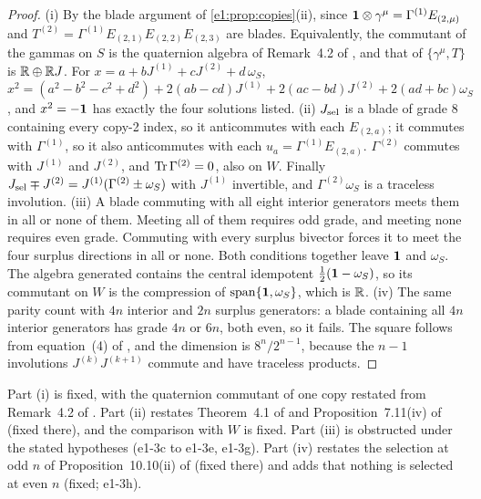 \begin{proof}
(i) By the blade argument of \cref{e1:prop:copies}(ii), since $\mathbf 1\otimes\gamma^\mu=\Gamma^{(1)}E_{(2,\mu)}$ and
$T^{(2)}=\Gamma^{(1)}E_{(2,1)}E_{(2,2)}E_{(2,3)}$ are blades. Equivalently, the commutant of the gammas on $S$ is the quaternion algebra of Remark~4.2
of \cite{ES17}, and that of $\{\gamma^\mu,T\}$ is $\mathbb{R}\oplus\mathbb{R} J$. For $x=a+bJ^{(1)}+cJ^{(2)}+d\,\omega_S$,
$x^2=(a^2-b^2-c^2+d^2)+2(ab-cd)J^{(1)}+2(ac-bd)J^{(2)}+2(ad+bc)\omega_S$, and $x^2=-\mathbf 1$ has exactly the four solutions listed. (ii) $J_{\rm sel}$ is a blade of
grade $8$ containing every copy-2 index, so it anticommutes with each $E_{(2,a)}$; it commutes with $\Gamma^{(1)}$, so it also
anticommutes with each $u_a=\Gamma^{(1)}E_{(2,a)}$. $\Gamma^{(2)}$ commutes with
$J^{(1)}$ and $J^{(2)}$, and $\operatorname{Tr}\Gamma^{(2)}=0$, also on $W$. Finally $J_{\rm sel}\mp J^{(2)}=J^{(1)}(\Gamma^{(2)}\pm\omega_S)$ with $J^{(1)}$
invertible, and $\Gamma^{(2)}\omega_S$ is a traceless involution. (iii) A blade commuting with all eight interior generators meets them in all or none
of them. Meeting all of them requires odd grade, and meeting none requires even grade. Commuting with every surplus bivector forces it to meet
the four surplus directions in all or none. Both conditions together leave $\mathbf 1$ and $\omega_S$. The algebra generated contains the
central idempotent $\tfrac12(\mathbf 1-\omega_S)$, so its commutant on $W$ is the compression of $\operatorname{span}\{\mathbf 1,\omega_S\}$, which is $\mathbb{R}$.
(iv) The same parity count with $4n$ interior and $2n$ surplus generators: a blade containing all $4n$ interior generators has grade $4n$ or
$6n$, both even, so it fails. The square follows from equation~(4) of \cite{ES17}, and the dimension is $8^n/2^{n-1}$, because the $n-1$
involutions $J^{(k)}J^{(k+1)}$ commute and have traceless products.
\end{proof}

Part (i) is fixed, with the quaternion commutant of one copy restated from Remark~4.2 of \cite{ES17}. Part (ii) restates Theorem~4.1 of
\cite{ES17} and Proposition~7.11(iv) of \cite{RE} (fixed there), and the comparison with $W$ is fixed. Part (iii) is obstructed under the
stated hypotheses (e1-3c to e1-3e, e1-3g). Part (iv) restates the selection at odd $n$ of Proposition~10.10(ii) of \cite{ES17} (fixed there)
and adds that nothing is selected at even $n$ (fixed; e1-3h).

